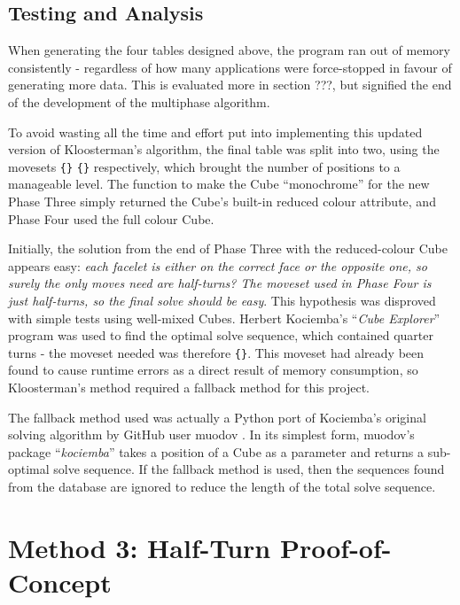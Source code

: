 \documentclass{report}
\newcommand{\tit}[1]{\textit{#1}}
\newcommand{\propernoun}[1]{\enquote{\tit{#1}}}
\newcommand{\moveset}[1]{\uppercase{\texttt{\{\formatmoves{#1}\}}}}
\begin{document}
	\subsection{Testing and Analysis}
	
	When generating the four tables designed above, the program ran out of memory consistently - regardless of how many applications were force-stopped in favour of generating more data. This is evaluated more in section ???, but signified the end of the development of the multiphase algorithm.
		
	To avoid wasting all the time and effort put into implementing this updated version of Kloosterman's algorithm, the final table was split into two, using the movesets \moveset{u'd'l2r2f2b2} \moveset{u2d2l2r2f2b2} respectively, which brought the number of positions to a manageable level. The function to make the Cube \enquote{monochrome} for the new Phase Three simply returned the Cube's built-in reduced colour attribute, and Phase Four used the full colour Cube.
	
	Initially, the solution from the end of Phase Three with the reduced-colour Cube appears easy: \tit{each facelet is either on the correct face or the opposite one, so surely the only moves need are half-turns? The moveset used in Phase Four is just half-turns, so the final solve should be easy}. This hypothesis was disproved with simple tests using well-mixed Cubes. Herbert Kociemba's \propernoun{Cube Explorer} program \cite{Kociemba} was used to find the optimal solve sequence, which contained quarter turns - the moveset needed was therefore \moveset{u'd'l2r2f2b2}. This moveset had already been found to cause runtime errors as a direct result of memory consumption, so Kloosterman's method required a fallback method for this project.
	
	The fallback method used was actually a Python port of Kociemba's original solving algorithm by GitHub user muodov \cite{muodov2018}. In its simplest form, muodov's package \propernoun{kociemba} takes a position of a Cube as a parameter and returns a sub-optimal solve sequence. If the fallback method is used, then the sequences found from the database are ignored to reduce the length of the total solve sequence.
	
	\section{Method 3: Half-Turn Proof-of-Concept} \label{sec:halfTurnSolving}
	
\end{document}
